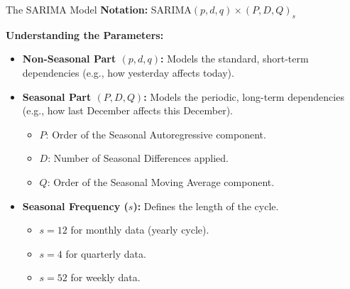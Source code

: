 \documentclass[aspectratio=169]{beamer}
\begin{document}
\begin{frame}{The SARIMA Model}
\textbf{Notation:} SARIMA$(p,d,q) \times (P,D,Q)_s$

\textbf{Understanding the Parameters:}
\begin{itemize}
    \item \textbf{Non-Seasonal Part $(p,d,q)$:} Models the standard, short-term dependencies (e.g., how yesterday affects today).
    
    \vspace{0.2cm}
    
    \item \textbf{Seasonal Part $(P,D,Q)$:} Models the periodic, long-term dependencies (e.g., how last December affects this December).
    \begin{itemize}
        \item $P$: Order of the Seasonal Autoregressive component.
        \item $D$: Number of Seasonal Differences applied.
        \item $Q$: Order of the Seasonal Moving Average component.
    \end{itemize}
    
    \vspace{0.2cm}
    
    \item \textbf{Seasonal Frequency ($s$):} Defines the length of the cycle.
    \begin{itemize}
        \item $s = 12$ for monthly data (yearly cycle).
        \item $s = 4$ for quarterly data.
        \item $s = 52$ for weekly data.
    \end{itemize}
\end{itemize}
\end{frame}
\end{document}
